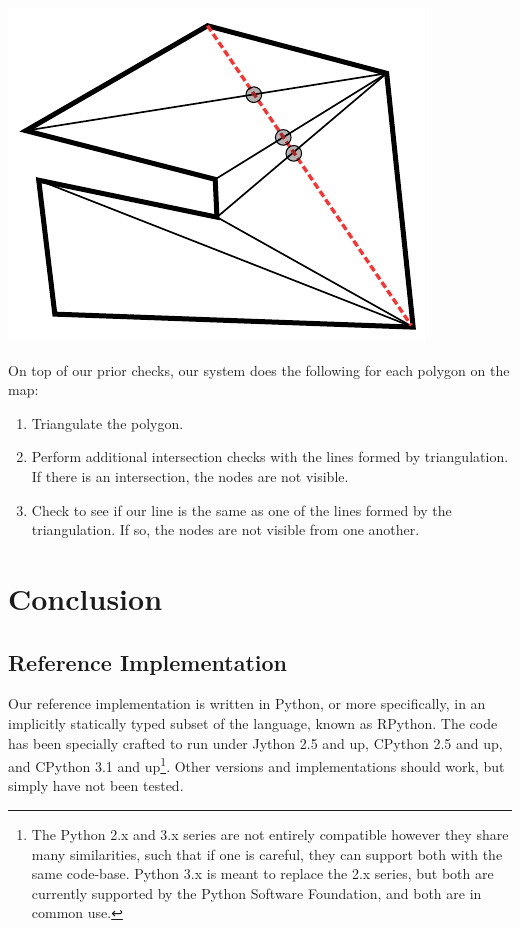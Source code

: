 \documentclass[letterpaper, 12pt]{article}
\begin{document}
\begin{multicols}{2}
\includegraphics[width=\columnwidth]{img/triangulation_in_action.pdf}

On top of our prior checks, our system does the following for each polygon on
the map:

\begin{enumerate}
    \item Triangulate the polygon.
    \item Perform additional intersection checks with the lines formed by
          triangulation. If there is an intersection, the nodes are not visible.
    \item Check to see if our line is the same as one of the lines formed by the
          triangulation. If so, the nodes are not visible from one another.
\end{enumerate}

\section{Conclusion}

\subsection{Reference Implementation}

Our reference implementation is written in Python, or more specifically, in an
implicitly statically typed subset of the language, known as RPython. The code
has been specially crafted to run under Jython 2.5 and up, CPython 2.5 and up,
and CPython 3.1 and up\footnote{The Python 2.x and 3.x series are not entirely
compatible however they share many similarities, such that if one is careful,
they can support both with the same code-base. Python 3.x is meant to replace
the 2.x series, but both are currently supported by the Python Software
Foundation, and both are in common use.}. Other versions and implementations
should work, but simply have not been tested.


\end{multicols}
\end{document}
